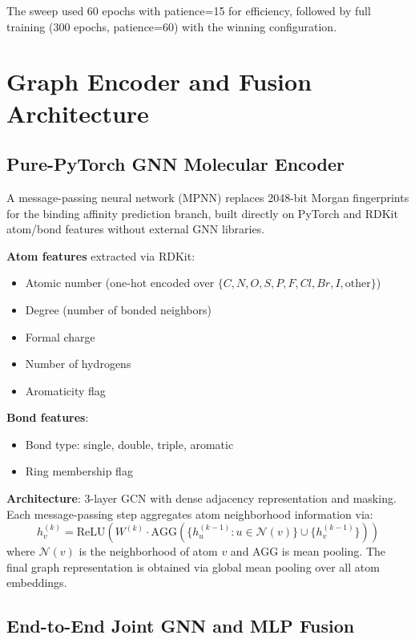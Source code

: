 \documentclass[a4paper,11pt,twoside]{report}
\begin{document}
The sweep used 60 epochs with patience=15 for efficiency, followed by full training (300 epochs, patience=60) with the winning configuration.

\section{Graph Encoder and Fusion Architecture}

\subsection{Pure-PyTorch GNN Molecular Encoder}

A message-passing neural network (MPNN) replaces 2048-bit Morgan fingerprints for the binding affinity prediction branch, built directly on PyTorch and RDKit atom/bond features without external GNN libraries.

\noindent \textbf{Atom features} extracted via RDKit:
\begin{itemize}
  \item Atomic number (one-hot encoded over $\{C, N, O, S, P, F, Cl, Br, I, \text{other}\}$)
  \item Degree (number of bonded neighbors)
  \item Formal charge
  \item Number of hydrogens
  \item Aromaticity flag
\end{itemize}

\noindent \textbf{Bond features}:
\begin{itemize}
  \item Bond type: single, double, triple, aromatic
  \item Ring membership flag
\end{itemize}

\noindent \textbf{Architecture}: 3-layer GCN with dense adjacency representation and masking. Each message-passing step aggregates atom neighborhood information via:
\begin{equation}
h_v^{(k)} = \text{ReLU}\left(W^{(k)} \cdot \text{AGG}\left(\{h_u^{(k-1)} : u \in \mathcal{N}(v)\} \cup \{h_v^{(k-1)}\}\right)\right)
\end{equation}
where $\mathcal{N}(v)$ is the neighborhood of atom $v$ and AGG is mean pooling. The final graph representation is obtained via global mean pooling over all atom embeddings.

\subsection{End-to-End Joint GNN and MLP Fusion}
\end{document}
